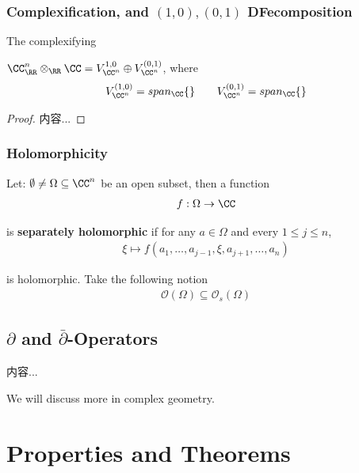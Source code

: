 \documentclass[Total.tex]{subfiles}
\begin{document}
				\subsubsection{Complexification, and $(1,0),(0,1)$ DFecomposition}
				
					The complexifying
					
					\begin{proposition}
						$\CC^n_\RR\otimes_\RR \CC=V_{\CC^n}^{1,0}\oplus V_{\CC^n}^{(0,1)}$, where
						\begin{gather*}
							V_{\CC^n}^{(1,0)}=span_\CC\{\}\qquad V_{\CC^n}^{(0,1)}=span_\CC\{\}
						\end{gather*}
					\end{proposition}
					\begin{proof}
						内容...
					\end{proof}
					
				\subsubsection{Holomorphicity}
					\begin{Def}
						Let: $\emptyset\not=\Omega\subseteq \CC^n$ be an open subset, then a function
						\begin{gather*}
							f:\Omega\rightarrow \CC
						\end{gather*}
						
						is \textbf{separately holomorphic} if for any $a\in \Omega$ and every $1\leq j\leq n$,
						\begin{gather*}
							\xi\mapsto f(a_1,\dots,a_{j-1},\xi,a_{j+1},\dots,a_n)
						\end{gather*}
						
						is holomorphic. Take the following notion
						\begin{gather*}
							\mathcal{O}(\Omega)\subseteq \mathcal{O}_s(\Omega)
						\end{gather*}
					\end{Def}
			\subsection{$\partial$ and $\bar{\partial}$-Operators}
			
				\begin{Def}
					内容...
				\end{Def}
				
				We will discuss more in complex geometry. 
		\section{Properties and Theorems}
\end{document}
